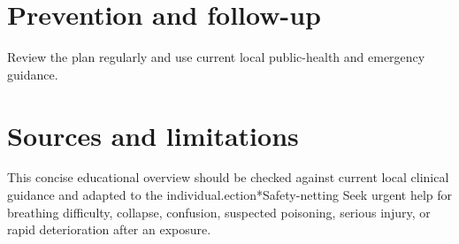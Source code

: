 \section*{Prevention and follow-up}
Review the plan regularly and use current local public-health and emergency guidance.

\section*{Sources and limitations}
This concise educational overview should be checked against current local clinical guidance and adapted to the individual.ection*{Safety-netting}
Seek urgent help for breathing difficulty, collapse, confusion, suspected poisoning, serious injury, or rapid deterioration after an exposure.
